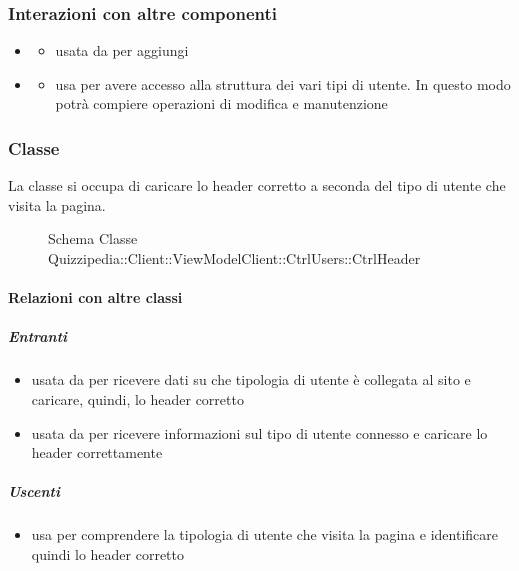 \subsubsection{Interazioni con altre componenti}
\begin{itemize}
\item {}
\begin{itemize}
\item usata da  per aggiungi
\end{itemize}
\item {}
\begin{itemize}
\item usa  per avere accesso alla struttura dei vari tipi di utente. In questo modo potrà compiere operazioni di modifica e manutenzione
\end{itemize}
\end{itemize}
\subsubsection{Classe }
La classe si occupa di caricare lo header corretto a seconda del tipo di utente che visita la pagina.
\begin{figure}[H]
\centering
\noindent{}
\caption[Schema Classe CtrlHeader]{Schema Classe Quizzipedia::Client::ViewModelClient::CtrlUsers::CtrlHeader}
\end{figure}
\paragraph{Relazioni con altre classi}
\subparagraph{Entranti}
\begin{itemize}
\item usata da  per ricevere dati su che tipologia di utente è collegata al sito e caricare, quindi, lo header corretto
\item usata da  per ricevere informazioni sul tipo di utente connesso e caricare lo header correttamente
\end{itemize}
\subparagraph{Uscenti}
\begin{itemize}
\item usa  per comprendere la tipologia di utente che visita la pagina e identificare quindi lo header corretto
\end{itemize}
